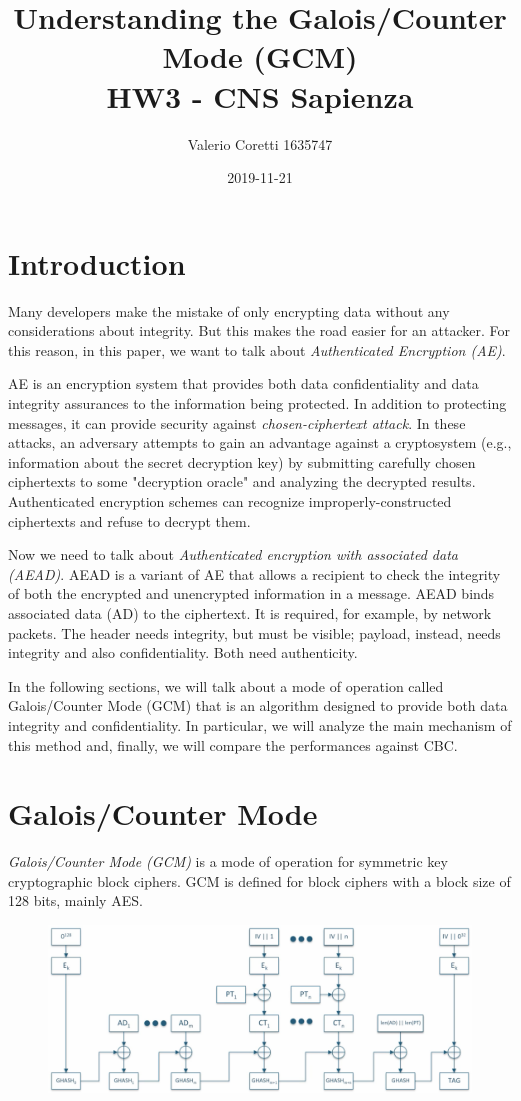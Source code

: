 \documentclass[11pt]{article}
\title{{\bf Understanding the Galois/Counter Mode (GCM)} \\ \bigskip \large HW3 - CNS Sapienza}
\date{2019-11-21}
\author{Valerio Coretti 1635747}
\begin{document}
\maketitle

\section{Introduction}
Many developers make the mistake of only encrypting data without any considerations about integrity. But this makes the road easier for an attacker. For this reason, in this paper, we want to talk about {\em Authenticated Encryption (AE)}.

AE is an encryption system that provides both data confidentiality and data integrity assurances to the information being protected. In addition to protecting messages, it can provide security against {\em chosen-ciphertext attack}. In these attacks, an adversary attempts to gain an advantage against a cryptosystem (e.g., information about the secret decryption key) by submitting carefully chosen ciphertexts to some "decryption oracle" and analyzing the decrypted results. Authenticated encryption schemes can recognize improperly-constructed ciphertexts and refuse to decrypt them.

Now we need to talk about {\em Authenticated encryption with associated data (AEAD)}.
AEAD is a variant of AE that allows a recipient to check the integrity of both the encrypted and unencrypted information in a message. AEAD binds associated data (AD) to the ciphertext. It is required, for example, by network packets. The header needs integrity, but must be visible; payload, instead, needs integrity and also confidentiality. Both need authenticity.

In the following sections, we will talk about a mode of operation called Galois/Counter Mode (GCM) that is an algorithm designed to provide both data integrity and confidentiality. In particular, we will analyze the main mechanism of this method and, finally, we will compare the performances against CBC.

\section{Galois/Counter Mode}
{\em Galois/Counter Mode (GCM)} is a mode of operation for symmetric key cryptographic block ciphers. GCM is defined for block ciphers with a block size of 128 bits, mainly AES.

\begin{figure}[!ht]
  \includegraphics[width=1\textwidth]{pic1-hw3-1635747}
  \label{fig:GCM}
\end{figure}
\end{document}
